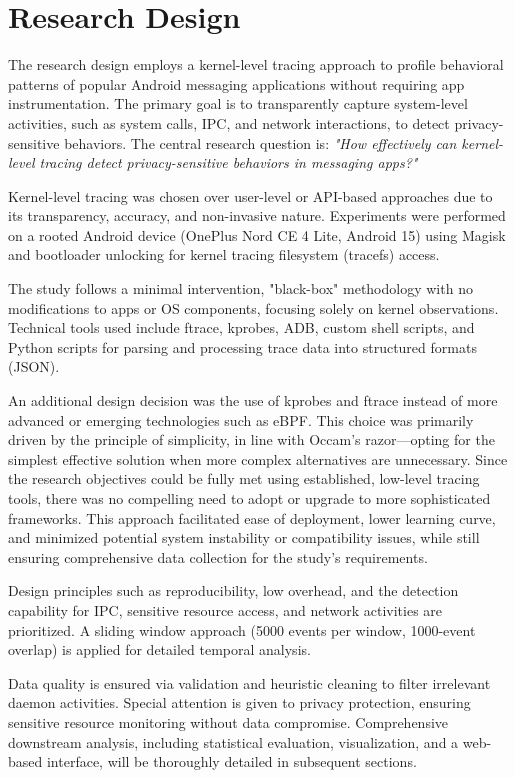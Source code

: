 \documentclass[a4paper,12pt]{report}
\begin{document}
\section{Research Design}
The research design employs a kernel-level tracing approach to profile behavioral patterns of popular Android messaging applications without requiring app instrumentation. The primary goal is to transparently capture system-level activities, such as system calls, IPC, and network interactions, to detect privacy-sensitive behaviors. The central research question is: \textit{"How effectively can kernel-level tracing detect privacy-sensitive behaviors in messaging apps?"}

Kernel-level tracing was chosen over user-level or API-based approaches due to its transparency, accuracy, and non-invasive nature. Experiments were performed on a rooted Android device (OnePlus Nord CE 4 Lite, Android 15) using Magisk and bootloader unlocking for kernel tracing filesystem (tracefs) access.

The study follows a minimal intervention, "black-box" methodology with no modifications to apps or OS components, focusing solely on kernel observations. Technical tools used include ftrace, kprobes, ADB, custom shell scripts, and Python scripts for parsing and processing trace data into structured formats (JSON).

An additional design decision was the use of kprobes and ftrace instead of more advanced or emerging technologies such as eBPF. This choice was primarily driven by the principle of simplicity, in line with Occam's razor—opting for the simplest effective solution when more complex alternatives are unnecessary. Since the research objectives could be fully met using established, low-level tracing tools, there was no compelling need to adopt or upgrade to more sophisticated frameworks. This approach facilitated ease of deployment, lower learning curve, and minimized potential system instability or compatibility issues, while still ensuring comprehensive data collection for the study's requirements.

Design principles such as reproducibility, low overhead, and the detection capability for IPC, sensitive resource access, and network activities are prioritized. A sliding window approach (5000 events per window, 1000-event overlap) is applied for detailed temporal analysis.

Data quality is ensured via validation and heuristic cleaning to filter irrelevant daemon activities. Special attention is given to privacy protection, ensuring sensitive resource monitoring without data compromise. Comprehensive downstream analysis, including statistical evaluation, visualization, and a web-based interface, will be thoroughly detailed in subsequent sections.
\end{document}
